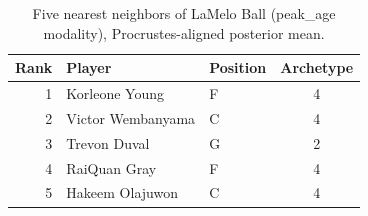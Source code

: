 \begin{table}[htbp]
  \centering\small
  \begin{tabular}{rllc}
    \toprule
    Rank & Player & Position & Archetype \\
    \midrule
    1 & Korleone Young & F & 4 \\
    2 & Victor Wembanyama & C & 4 \\
    3 & Trevon Duval & G & 2 \\
    4 & RaiQuan Gray & F & 4 \\
    5 & Hakeem Olajuwon & C & 4 \\
    \bottomrule
  \end{tabular}
  \caption{Five nearest neighbors of LaMelo Ball (peak_age modality), Procrustes-aligned posterior mean.}
  \label{tab:LaMelo_Ball_neighbors_peak_age}
\end{table}

